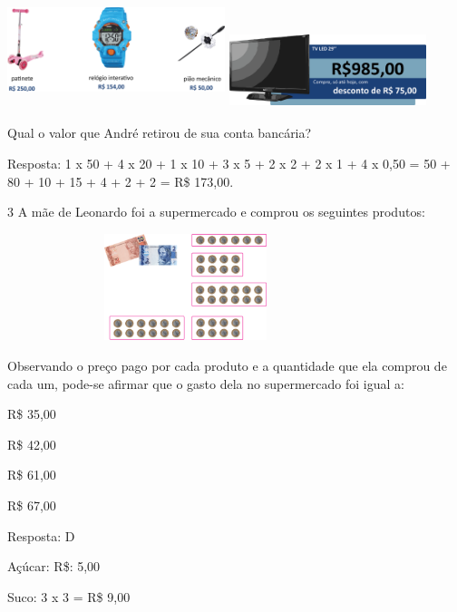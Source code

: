 \begin{escolha}
{\includegraphics[width=2.50022in,height=1.34178in]{media/image72.png}
\includegraphics[width=2.26686in,height=0.87508in]{media/image73.png}

Qual o valor que André retirou de sua conta bancária?


Resposta:
1 x 50 + 4 x 20 + 1 x 10 + 3 x 5 + 2 x 2 + 2 x 1 + 4 x 0,50 = 50 + 80 +
10 + 15 + 4 + 2 + 2 = R\$ 173,00.

\num{3} A mãe de Leonardo foi a supermercado e comprou os seguintes produtos:


\includegraphics[width=4.10036in,height=1.22511in]{media/image74.png}

Observando o preço pago por cada produto e a quantidade que ela comprou de cada um, pode-se afirmar que o gasto dela no supermercado foi igual a:

\begin{escolha}

\item
  R\$ 35,00
\item
  R\$ 42,00
\item
  R\$ 61,00
\item
  R\$ 67,00
\end{escolha}

Resposta: D

Açúcar: R\$: 5,00

Suco: 3 x 3 = R\$ 9,00

}
\end{escolha}
